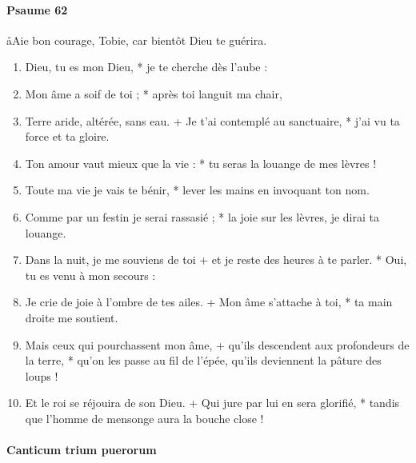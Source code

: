 \documentclass[twoside]{article}
\begin{document}
\begin{paracol}[1]{2}
\paragraph{Psaume 62}

\aa Aie bon courage, Tobie, car bientôt Dieu te guérira.


\begin{enumerate}[wide, itemsep=0mm, labelwidth=!, labelindent=0pt, label=\color{gregoriocolor}\theenumi]

\item Dieu, tu es mon Dieu, *
je te cherche dès l’aube :
   
\item Mon âme a soif de toi ; *
après toi languit ma chair,

\item Terre aride, altérée, sans eau. +
Je t’ai contemplé au sanctuaire, *
j’ai vu ta force et ta gloire.

\item Ton amour vaut mieux que la vie : *
tu seras la louange de mes lèvres !

\item Toute ma vie je vais te bénir, *
lever les mains en invoquant ton nom.

\item Comme par un festin je serai rassasié ; *
la joie sur les lèvres, je dirai ta louange.

\item Dans la nuit, je me souviens de toi +
et je reste des heures à te parler. *
Oui, tu es venu à mon secours :

\item Je crie de joie à l’ombre de tes ailes. +
Mon âme s’attache à toi, *
ta main droite me soutient.

\item Mais ceux qui pourchassent mon âme, +
qu'ils descendent aux profondeurs de la terre, *
qu'on les passe au fil de l'épée, qu'ils deviennent la pâture des loups !

\item Et le roi se réjouira de son Dieu. +
Qui jure par lui en sera glorifié, *
tandis que l'homme de mensonge aura la bouche close !


\end{enumerate}

\switchcolumn*
\paragraph{Canticum trium puerorum}


\end{paracol}
\end{document}
